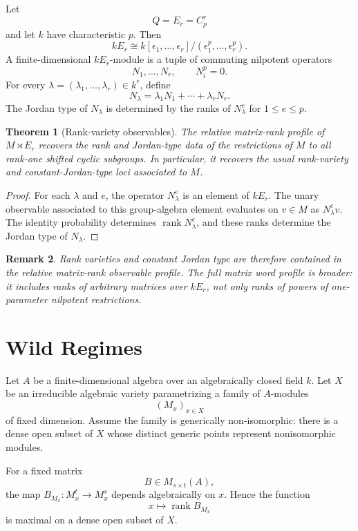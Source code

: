 \documentclass[11pt]{article}
\newtheorem{theorem}{Theorem}[section]
\newtheorem{remark}[theorem]{Remark}
\begin{document}
Let
\[
Q=E_r=C_p^r
\]
and let $k$ have characteristic $p$. Then
\[
kE_r\cong k[\epsilon_1,\ldots,\epsilon_r]/(\epsilon_1^p,\ldots,\epsilon_r^p).
\]
A finite-dimensional $kE_r$-module is a tuple of commuting nilpotent operators
\[
N_1,\ldots,N_r,
\qquad
N_i^p=0.
\]
For every $\lambda=(\lambda_1,\ldots,\lambda_r)\in k^r$, define
\[
N_\lambda=\lambda_1N_1+\cdots+\lambda_rN_r.
\]
The Jordan type of $N_\lambda$ is determined by the ranks of $N_\lambda^e$ for $1\le e\le p$.

\begin{theorem}[Rank-variety observables]
The relative matrix-rank profile of $M\rtimes E_r$ recovers the rank and Jordan-type data of the restrictions of $M$ to all rank-one shifted cyclic subgroups. In particular, it recovers the usual rank-variety and constant-Jordan-type loci associated to $M$.
\end{theorem}

\begin{proof}
For each $\lambda$ and $e$, the operator $N_\lambda^e$ is an element of $kE_r$. The unary observable associated to this group-algebra element evaluates on $v\in M$ as $N_\lambda^ev$. The identity probability determines $\operatorname{rank}N_\lambda^e$, and these ranks determine the Jordan type of $N_\lambda$.
\end{proof}

\begin{remark}
Rank varieties and constant Jordan type are therefore contained in the relative matrix-rank observable profile. The full matrix word profile is broader: it includes ranks of arbitrary matrices over $kE_r$, not only ranks of powers of one-parameter nilpotent restrictions.
\end{remark}

\section{Wild Regimes}

Let $A$ be a finite-dimensional algebra over an algebraically closed field $k$. Let $X$ be an irreducible algebraic variety parametrizing a family of $A$-modules
\[
(M_x)_{x\in X}
\]
of fixed dimension. Assume the family is generically non-isomorphic: there is a dense open subset of $X$ whose distinct generic points represent nonisomorphic modules.

For a fixed matrix
\[
B\in M_{s\times t}(A),
\]
the map $B_{M_x}:M_x^t\to M_x^s$ depends algebraically on $x$. Hence the function
\[
x\mapsto \operatorname{rank}B_{M_x}
\]
is maximal on a dense open subset of $X$.
\end{document}
